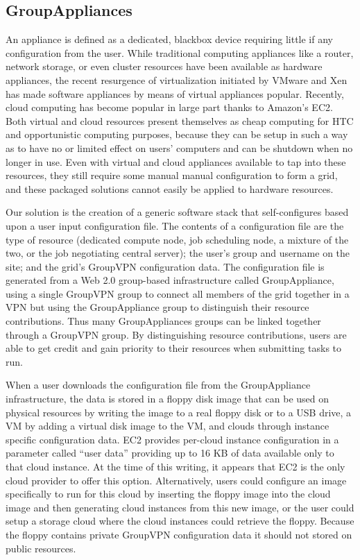 \documentclass{sig-alternate}
\begin{document}
\subsection{GroupAppliances}
An appliance is defined as a dedicated, blackbox device requiring little if any
configuration from the user.  While traditional computing appliances like a
router, network storage, or even cluster resources have been available as
hardware appliances, the recent resurgence of virtualization initiated by
VMware and Xen has made software appliances by means of virtual appliances
popular.  Recently, cloud computing has become popular in large part thanks to
Amazon's EC2.  Both virtual and cloud resources present themselves as cheap
computing for HTC and opportunistic computing purposes, because they can be
setup in such a way as to have no or limited effect on users' computers and can
be shutdown when no longer in use.  Even with virtual and cloud appliances 
available to tap into these resources, they still require some manual
manual configuration to form a grid, and these packaged solutions cannot easily
be applied to hardware resources.

Our solution is the creation of a generic software stack that self-configures
based upon a user input configuration file.  The contents of a configuration
file are the type of resource (dedicated compute node, job scheduling node, a
mixture of the two, or the job negotiating central server); the user's group and
username on the site; and the grid's GroupVPN configuration data.  The
configuration file is generated from a Web 2.0 group-based infrastructure
called GroupAppliance, using a single GroupVPN group to connect all members of
the grid together in a VPN but using the GroupAppliance group to distinguish
their resource contributions.  Thus many GroupAppliances groups can be linked
together through a GroupVPN group.  By distinguishing resource contributions,
users are able to get credit and gain priority to their resources when
submitting tasks to run.

When a user downloads the configuration file from the GroupAppliance
infrastructure, the data is stored in a floppy disk image that can be used on
physical resources by writing the image to a real floppy disk or to a USB drive,
a VM by adding a virtual disk image to the VM, and clouds through instance
specific configuration data.  EC2 provides per-cloud instance configuration in a
parameter called ``user data'' providing up to 16 KB of data available only to
that cloud instance.  At the time of this writing, it appears that EC2 is the
only cloud provider to offer this option.  Alternatively, users could configure
an image specifically to run for this cloud by inserting the floppy image into
the cloud image and then generating cloud instances from this new image, or the
user could setup a storage cloud where the cloud instances could retrieve the
floppy.  Because the floppy contains private GroupVPN configuration data it
should not stored on public resources.
\end{document}
